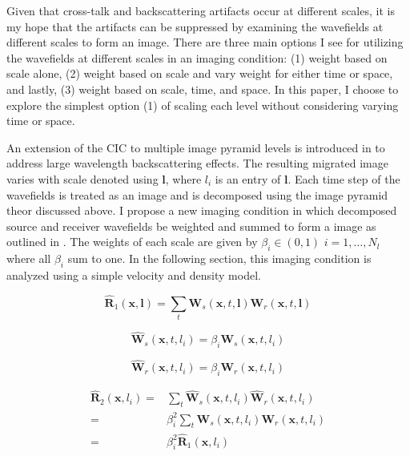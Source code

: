 Given that cross-talk and backscattering artifacts occur at different scales, it is my hope that the artifacts can be suppressed by examining the wavefields at different scales to form an image.  There are three main options I see for utilizing the wavefields at different scales in an imaging condition: (1) weight based on scale alone, (2) weight based on scale and vary weight for either time or space, and lastly, (3) weight based on scale, time, and space.  In this paper, I choose to explore the simplest option (1) of scaling each level without considering varying time or space. 

An extension of the CIC to multiple image pyramid levels is introduced in  to address large wavelength backscattering effects.  The resulting migrated image varies with scale denoted using $\mathbf{l}$, where $l_i$ is an entry of $\mathbf{l}$.  Each time step of the wavefields is treated as an image and is decomposed using the image pyramid theor discussed above.  I propose a new imaging condition in which decomposed source and receiver wavefields be weighted and summed to form a image as outlined in .  The weights of each scale are given by $\beta_i \in (0,1)$ $i=1,\hdots,N_l$ where all $\beta_i$ sum to one.  In the following section, this imaging condition is analyzed using a simple velocity and density model.

\begin{equation} \label{eqn:cic_level}
\hat{\mathbf{R}}_1(\mathbf{x},\mathbf{l})=\sum_t {\mathbf{W}_s(\mathbf{x},t,\mathbf{l})\mathbf{W}_r(\mathbf{x},t,\mathbf{l})}
\end{equation}


\begin{equation} \label{eqn:ws_hat}
\hat{\mathbf{W}}_s(\mathbf{x},t,l_i)=\beta_i\mathbf{W}_s(\mathbf{x},t,l_i)
\end{equation}

\begin{equation} \label{eqn:wr_hat}
\hat{\mathbf{W}}_r(\mathbf{x},t,l_i)=\beta_i\mathbf{W}_r(\mathbf{x},t,l_i)
\end{equation}

\begin{equation} \label{eqn:cic_level_s}
\begin{aligned}
\hat{\mathbf{R}}_2(\mathbf{x},l_i)
=&\sum_t {\hat{\mathbf{W}}_s(\mathbf{x},t,l_i)\hat{\mathbf{W}}_r(\mathbf{x},t,l_i)}\\
=&\beta_i^2\sum_t {\mathbf{W}_s(\mathbf{x},t,l_i)\mathbf{W}_r(\mathbf{x},t,l_i)}\\
=&\beta_i^2       \hat{\mathbf{R}}_1(\mathbf{x},l_i) 
\end{aligned}
\end{equation}

